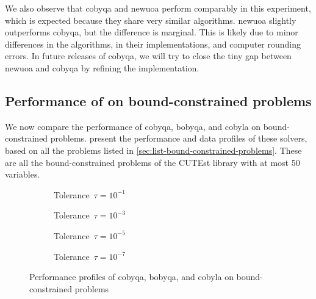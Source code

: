 We also observe that \gls{cobyqa} and \gls{newuoa} perform comparably in this experiment, which is expected because they share very similar algorithms.
\Gls{newuoa} slightly outperforms \gls{cobyqa}, but the difference is marginal.
This is likely due to minor differences in the algorithms, in their implementations, and computer rounding errors.
In future releases of \gls{cobyqa}, we will try to close the tiny gap between \gls{newuoa} and \gls{cobyqa} by refining the implementation.

\subsection{Performance of  on bound-constrained problems}

We now compare the performance of \gls{cobyqa}, \gls{bobyqa}, and \gls{cobyla} on bound-constrained problems.
 present the performance and data profiles of these solvers, based on all the problems listed in \cref{sec:list-bound-constrained-problems}.
These are all the bound-constrained problems of the CUTEst library with at most \num{50} variables.

\begin{figure}[ht]
    \centering
    \begin{subfigure}[b]{0.49\textwidth}
        \centering
        \caption{Tolerance~$\tau = 10^{-1}$}
    \end{subfigure}
    \hfill
    \begin{subfigure}[b]{0.49\textwidth}
        \centering
        \caption{Tolerance~$\tau = 10^{-3}$}
    \end{subfigure}
    \begin{subfigure}[b]{0.49\textwidth}
        \centering
        \caption{Tolerance~$\tau = 10^{-5}$}
    \end{subfigure}
    \hfill
    \begin{subfigure}[b]{0.49\textwidth}
        \centering
        \caption{Tolerance~$\tau = 10^{-7}$}
    \end{subfigure}
    \caption[Performance profiles on bound-constrained problems]{Performance profiles of \gls{cobyqa}, \gls{bobyqa}, and \gls{cobyla} on bound-constrained problems}
    \label{fig:perf-bound-constrained-problems}
\end{figure}

